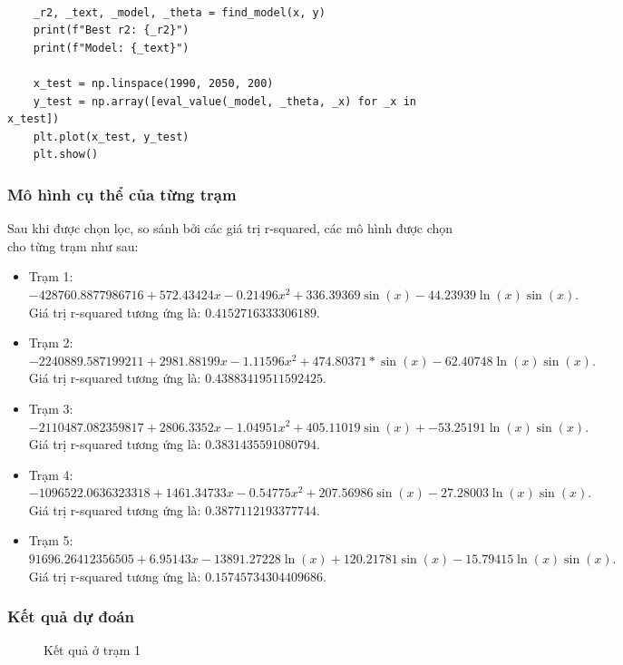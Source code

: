 \documentclass[a4paper]{article}
\begin{document}
\begin{lstlisting}
    
    _r2, _text, _model, _theta = find_model(x, y)
    print(f"Best r2: {_r2}")
    print(f"Model: {_text}")

    x_test = np.linspace(1990, 2050, 200)
    y_test = np.array([eval_value(_model, _theta, _x) for _x in x_test])
    plt.plot(x_test, y_test)
    plt.show()
\end{lstlisting}

\subsubsection{Mô hình cụ thể của từng trạm}
Sau khi được chọn lọc, so sánh bởi các giá trị r-squared, các mô hình được chọn cho từng trạm như sau:
\begin{itemize}
\item Trạm 1: $ - 428760.8877986716 + 572.43424x  - 0.21496{x^2} + 336.39369\sin \left( x \right) - 44.23939\ln (x)\sin \left( x \right).$ Giá trị r-squared tương ứng là: $0.4152716333306189.$
\item Trạm 2: $ - 2240889.587199211 + 2981.88199x - 1.11596{x^2} + 474.80371*\sin \left( x \right) - 62.40748\ln \left( x \right)\sin \left( x \right).$ Giá trị r-squared tương ứng là: $0.43883419511592425.$
\item Trạm 3: $ - 2110487.082359817 + 2806.3352x - 1.04951{x^2} + 405.11019\sin \left( x \right) +  - 53.25191\ln \left( x \right)\sin \left( x \right).$ Giá trị r-squared tương ứng là: $0.3831435591080794.$
\item Trạm 4: $ - 1096522.0636323318 + 1461.34733x - 0.54775{x^2} + 207.56986\sin \left( x \right) - 27.28003\ln \left( x \right)\sin \left( x \right).$ Giá trị r-squared tương ứng là: $0.3877112193377744.$
\item Trạm 5: $91696.26412356505 + 6.95143x - 13891.27228\ln \left( x \right) + 120.21781\sin \left( x \right) - 15.79415\ln \left( x \right)\sin \left( x \right).$ Giá trị r-squared tương ứng là: $0.15745734304409686.$
\end{itemize}

\subsubsection{Kết quả dự đoán}
\begin{figure}[H]
\caption{Kết quả ở trạm 1}
\end{figure}
\end{document}

